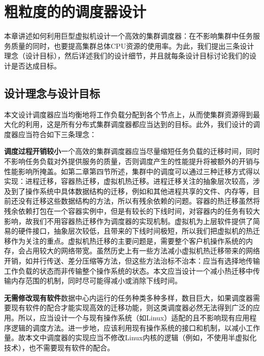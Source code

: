 
\chapter{粗粒度的的调度器设计}
\label{chap:LB}
本章讲述如何利用巨型虚拟机设计一个高效的集群调度器：在不影响集群中任务服务质量的同时，也要提高集群总体CPU资源的使用率。为此，我们提出三条设计理念（设计目标），然后详述我们的设计细节，并且就每条设计目标讨论我们的设计是否达成目标。
\section{设计理念与设计目标}
本文设计调度器应当均衡地将工作负载分配到各个节点上，从而使集群资源得到最大化的利用，这是所有分布式集群调度器都应当达到的目标。此外，我们设计的调度器应当符合如下三条理念：

\noindent\textbf{调度过程开销较小}\quad 一个高效的集群调度器应当尽量缩短任务负载的迁移时间，同时不影响任务负载对外提供服务的质量，否则调度产生的性能提升将被额外的开销与性能影响所掩盖。如第二章第四节所述，集群中的调度可以通过三种迁移方式得以实现：进程迁移，容器热迁移，虚拟机热迁移。进程迁移关注的抽象层次较高，涉及到了操作系统中具体数据结构的迁移，例如和其他进程共享的文件、内存等，目前还没有迁移这些数据结构的方法，所以有残余依赖的问题。容器的热迁移虽然将残余依赖打包在一个容器实例中，但是有较长的下线时间，对容器内的任务有较大影响，故我们不用容器热迁移作为调度器的实现机制。虚拟机为上层软件提供了简易的硬件接口，抽象层次较低，且带来的下线时间极短，所以我们把虚拟机的热迁移作为关注的重点。虚拟机热迁移的主要问题是，需要整个客户机操作系统的内存，会占用较大的网络带宽。虽然历史上有一些方法减小虚拟机热迁移带来的网络开销，如并行传送\cite{parallelm}、差分压缩\cite{compression}等方法，但这些方法治标不治本：应当有选择地传输工作负载的状态而非传输整个操作系统的状态。本文应当设计一个减小热迁移中传输内存范围的机制，同时尽可能得减小或消除下线时间。

\noindent\textbf{无需修改现有软件}\quad 数据中心内运行的任务种类多种多样，数目巨大，如果调度器需要现有软件的配合才能实现高效的迁移功能，则这类调度器必然无法得到广泛的应用。所以，应当设计一个与现有操作系统（如Linux）适配的且不影响现有应用程序逻辑的调度方法。进一步地，应该利用现有操作系统的接口和机制，以减小工作量。故本文中调度器的实现应当不修改Linux内核的逻辑（例如，不使用半虚拟化技术），也不需要现有软件的配合。

